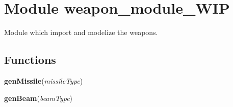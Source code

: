 %
%
%


\section{Module weapon\_module\_WIP}

    \label{weapon_module_WIP}
Module which import and modelize the weapons.



  \subsection{Functions}

    \label{weapon_module_WIP:genMissile}

    \vspace{0.5ex}

\hspace{.8\funcindent}\begin{boxedminipage}{\funcwidth}

    \raggedright \textbf{genMissile}(\textit{missileType})

\setlength{\parskip}{2ex}
\setlength{\parskip}{1ex}
    \end{boxedminipage}

    \label{weapon_module_WIP:genBeam}

    \vspace{0.5ex}

\hspace{.8\funcindent}\begin{boxedminipage}{\funcwidth}

    \raggedright \textbf{genBeam}(\textit{beamType})

\setlength{\parskip}{2ex}
\setlength{\parskip}{1ex}
    \end{boxedminipage}

